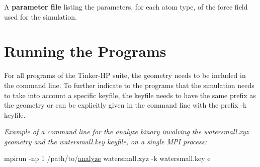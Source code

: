 \begin{DoxyItemize}
\item A {\bfseries parameter file} listing the parameters, for each atom type, of the force field used for the simulation.
\end{DoxyItemize}\hypertarget{tinker_hp_suite_running_the_programs}{}\section{Running the Programs}\label{tinker_hp_suite_running_the_programs}
For all programs of the Tinker-\/\-H\-P suite, the geometry needs to be included in the command line. To further indicate to the programs that the simulation needs to take into account a specific keyfile, the keyfile needs to have the same prefix as the geometry or can be explicitly given in the command line with the prefix {\ttfamily -\/k keyfile}.

{\itshape Example of a command line for the analyze binary involving the {\ttfamily watersmall.\-xyz} geometry and the {\ttfamily watersmall.\-key} keyfile, on a single M\-P\-I process\-:}


\begin{DoxyCode}
mpirun -np 1 /path/to/\hyperlink{analyze_8f90_ad0571e0cf34d424af56a4981e316f8eb}{analyze} watersmall.xyz -k watersmall.key e
\end{DoxyCode}


